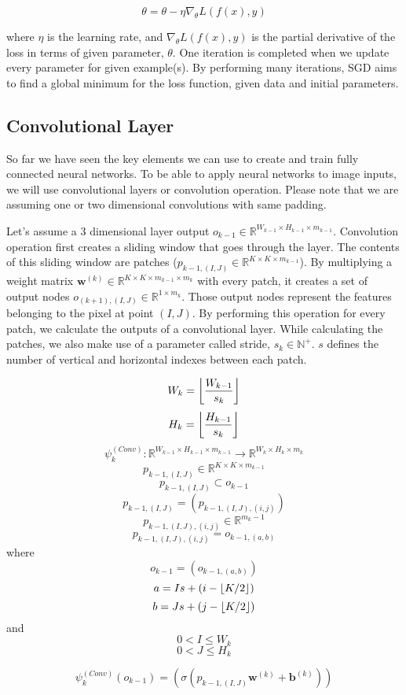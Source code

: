 $$ \theta = \theta- \eta \nabla_\theta{L(f(x), y)} $$

where $\eta$ is the learning rate, and $\nabla_\theta{L(f(x), y)}$ is the partial derivative of the loss in terms of given parameter, $\theta$. One iteration is completed when we update every parameter for given example(s). By performing many iterations, SGD aims to find a global minimum for the loss function, given data and initial parameters.

\subsection{Convolutional Layer}
So far we have seen the key elements we can use to create and train fully connected neural networks. To be able to apply neural networks to image inputs, we will use convolutional layers or convolution operation. Please note that we are assuming one or two dimensional convolutions with same padding. 

Let's assume a 3 dimensional layer output $o_{k-1} \in \mathbb{R}^{W_{k-1} \times H_{k-1} \times m_{k-1}}$. Convolution operation first creates a sliding window that goes through the layer. The contents of this sliding window are patches ($p_{k-1,(I,J)} \in \mathbb{R}^{K \times K \times m_{k-1}}$). By multiplying a weight matrix $\mathbf{w}^{(k)} \in \mathbb{R}^{K \times K \times m_{k-1} \times m_k}$ with every patch, it creates a set of output nodes $o_{(k+1),(I,J)} \in \mathbb{R}^{1 \times m_k}$. Those output nodes represent the features belonging to the pixel at point $(I,J)$. By performing this operation for every patch, we calculate the outputs of a convolutional layer. While calculating the patches, we also make use of a parameter called stride, $s_k \in \mathbb{N}^+$. $s$ defines the number of vertical and horizontal indexes between each patch.

$$ W_k = \floor*{\frac{W_{k-1}}{s_k}}$$
$$ H_k = \floor*{\frac{H_{k-1}}{s_k}}$$
$$ \psi_{k}^{(Conv)} : \mathbb{R}^{W_{k-1} \times H_{k-1} \times m_{k-1} } \rightarrow \mathbb{R}^{ W_k \times H_k \times m_k} $$
$$ p_{k-1,(I,J)} \in \mathbb{R}^{K \times K \times m_{k-1}} $$
$$ p_{k-1,(I,J)} \subset o_{k-1}$$
$$ p_{k-1,(I,J)} = (p_{k-1,(I,J),(i,j)}) $$
$$ p_{k-1,(I,J),(i,j)} \in \mathbb{R}^{m_k-1} $$
$$ p_{k-1,(I,J),(i,j)} = o_{k-1,(a,b)} $$
where
$$ o_{k-1} = (o_{k-1,(a,b)})$$
$$ a = Is + (i - \floor*{K/2}) $$
$$ b = Js + (j - \floor*{K/2}) $$
and 
$$ 0 < I \leq W_k$$
$$ 0 < J \leq H_k$$

$$\psi_{k}^{(Conv)}(o_{k-1}) = (\sigma(p_{k-1,(I,J)} \mathbf{w}^{(k)} + \mathbf{b}^{(k)})) $$


